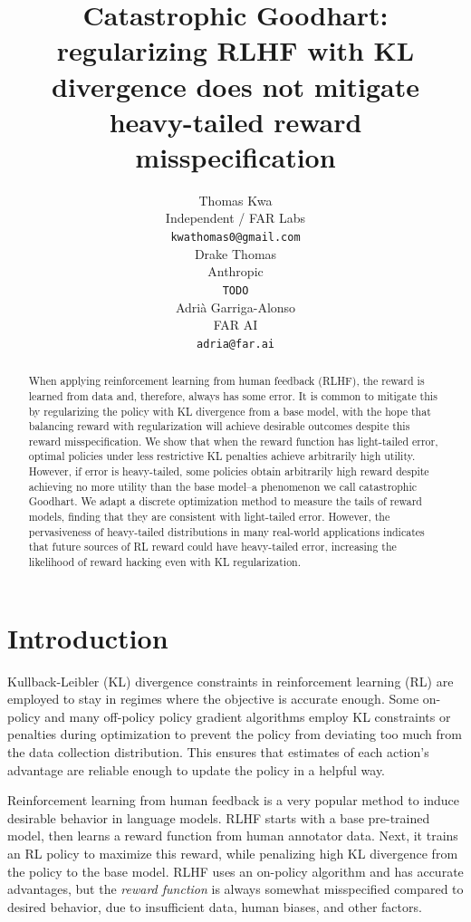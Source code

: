 \documentclass{article}
\title{Catastrophic Goodhart: regularizing RLHF with KL divergence does not mitigate heavy-tailed reward misspecification}
\author{%
  Thomas Kwa \\
  Independent / FAR Labs \\
  \texttt{kwathomas0@gmail.com} \\
  \And
  Drake Thomas \\
  Anthropic \\
  \texttt{TODO} \\
  \And
  Adrià Garriga-Alonso \\
  FAR AI \\
  \texttt{adria@far.ai} \\
}
\begin{document}
\maketitle

 \begin{abstract}
  When applying reinforcement learning from human feedback (RLHF), the reward is learned from data and, therefore, always has some error. It is common to mitigate this by regularizing the policy with KL divergence from a base model, with the hope that balancing reward with regularization will achieve desirable outcomes despite this reward misspecification. We show that when the reward function has light-tailed error, optimal policies under less restrictive KL penalties achieve arbitrarily high utility. However, if error is heavy-tailed, some policies obtain arbitrarily high reward despite achieving no more utility than the base model--a phenomenon we call catastrophic Goodhart. We adapt a discrete optimization method to measure the tails of reward models, finding that they are consistent with light-tailed error. However, the pervasiveness of heavy-tailed distributions in many real-world applications indicates that future sources of RL reward could have heavy-tailed error, increasing the likelihood of reward hacking even with KL regularization.
\end{abstract}

\section{Introduction}

Kullback-Leibler (KL) divergence constraints in reinforcement learning (RL) are employed to stay in regimes where the objective is accurate enough.
Some on-policy \citep{trpo,ppo} and many off-policy \citep{abdolmaleki18mpo,jaques2019way} policy gradient algorithms employ KL constraints or penalties during optimization to prevent the policy from deviating too much from the data collection distribution. This ensures that estimates of each action's advantage are reliable enough to update the policy in a helpful way.

Reinforcement learning from human feedback \citep[RLHF]{rlhf_christiano,ziegler2020finetuning} is a very popular method to induce desirable behavior in language models. RLHF starts with a base pre-trained model, then learns a reward function from human annotator data. Next, it trains an RL policy to maximize this reward, while penalizing high KL divergence from the policy to the base model. RLHF uses an on-policy algorithm and has accurate advantages, but the \emph{reward function} is always somewhat misspecified compared to desired behavior, due to insufficient data, human biases, and other factors.
\end{document}
